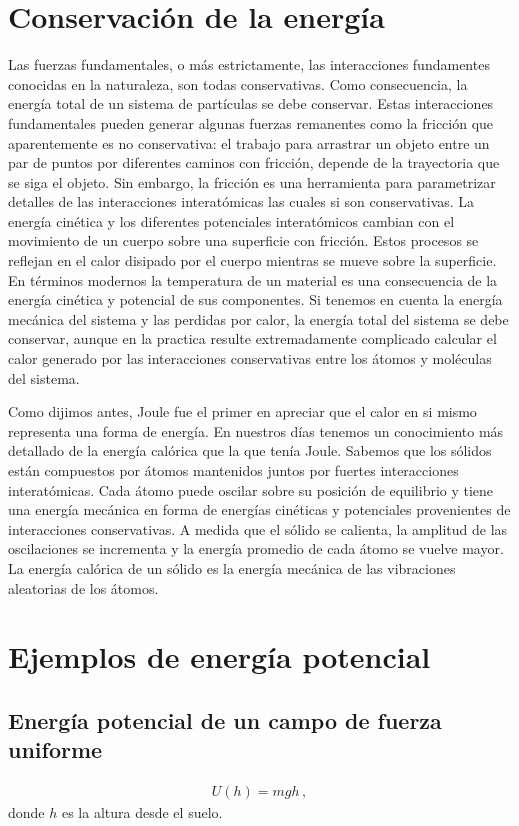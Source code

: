 \section{Conservación de la energía}
Las fuerzas fundamentales, o más estrictamente, las interacciones
fundamentes conocidas en la naturaleza, son todas conservativas. Como
consecuencia, la energía total de un sistema de partículas se debe
conservar. Estas interacciones fundamentales pueden generar algunas
fuerzas remanentes como la fricción que aparentemente es no
conservativa: el trabajo para arrastrar un objeto entre un par de
puntos por diferentes caminos con fricción, depende de la trayectoria
que se siga el objeto. Sin embargo, la fricción es una herramienta
para parametrizar detalles de las interacciones interatómicas las
cuales si son conservativas. La energía cinética y los diferentes
potenciales interatómicos cambian con el movimiento de un cuerpo sobre una
superficie con fricción. Estos procesos se reflejan en el calor
disipado por el cuerpo mientras se mueve sobre la superficie. En
términos modernos la temperatura de un material es una consecuencia
de la energía cinética y potencial de sus componentes. Si tenemos en
cuenta la energía mecánica del sistema y las perdidas por calor, la
energía total del sistema se debe conservar, aunque en la practica
resulte extremadamente complicado calcular el calor generado por las
interacciones conservativas entre los átomos y moléculas del sistema.

Como dijimos antes, Joule fue el primer en apreciar que
el calor en si mismo representa una forma de energía. 
En nuestros días tenemos un conocimiento más detallado de la energía
calórica que la que tenía Joule. Sabemos que los sólidos están
compuestos por átomos mantenidos juntos por fuertes interacciones
interatómicas. Cada átomo puede oscilar sobre su posición de
equilibrio y tiene una energía mecánica en forma de energías cinéticas
y potenciales provenientes de interacciones conservativas. A medida
que el sólido se calienta, la amplitud de las oscilaciones se
incrementa y la energía promedio de cada átomo se vuelve mayor. La
energía calórica de un sólido es la energía mecánica de las
vibraciones aleatorias de los átomos.
   

\section{Ejemplos de energía potencial}

\subsection{Energía potencial de un campo de fuerza uniforme}
\begin{align}
  U(h)=mgh\,,
\end{align}
donde $h$ es la altura desde el suelo.

